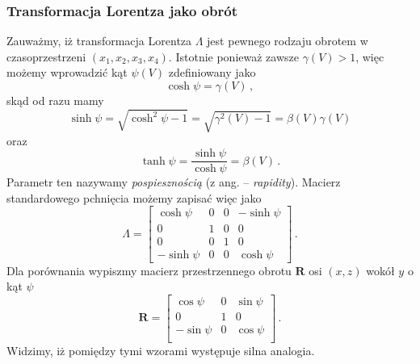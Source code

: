 \documentclass[../main.tex]{subfiles}
\begin{document}
\subsubsection{Transformacja Lorentza jako obrót}
Zauważmy, iż transformacja Lorentza \(\Lambda\) jest pewnego rodzaju obrotem w czasoprzestrzeni
\((x_1,x_2,x_3,x_4)\). Istotnie ponieważ zawsze \(\gamma(V)>1\), więc możemy wprowadzić kąt
\(\psi(V)\) zdefiniowany jako
\begin{equation*}
    \cosh\psi=\gamma(V)\,,
\end{equation*}
skąd od razu mamy
\begin{equation*}
    \sinh\psi=\sqrt{\cosh^2\psi-1}=\sqrt{\gamma^2(V)-1}=\beta(V)\gamma(V)
\end{equation*}
oraz
\begin{equation*}
    \tanh\psi=\frac{\sinh\psi}{\cosh\psi}=\beta(V)\,.
\end{equation*}
Parametr ten nazywamy \textit{pospiesznością} (z ang. -- \textit{rapidity}). Macierz standardowego
pchnięcia możemy zapisać więc jako
\begin{equation*}
    \Lambda=\left[\begin{array}{cccc}
         \cosh\psi&0&0&-\sinh\psi \\
         0&1&0&0  \\
         0&0&1&0  \\
         -\sinh\psi &0&0&\cosh\psi
    \end{array}\right]\,.
\end{equation*}
Dla porównania wypiszmy macierz przestrzennego obrotu \(\mathbf{R}\) osi \((x,z)\) wokół \(y\) o kąt
\(\psi\)
\begin{equation*}
    \mathbf{R}=\left[\begin{array}{ccc}
         \cos\psi&0&\sin\psi  \\
         0&1&0  \\
         -\sin\psi&0&\cos\psi  \\
    \end{array}\right]\,.
\end{equation*}
Widzimy, iż pomiędzy tymi wzorami występuje silna analogia.
\end{document}
